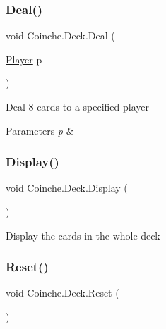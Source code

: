 \subsubsection{\texorpdfstring{Deal()}{Deal()}}
{\footnotesize\ttfamily void Coinche.\+Deck.\+Deal (\begin{DoxyParamCaption}\item[{\hyperlink{class_coinche_1_1_player}{Player}}]{p }\end{DoxyParamCaption})\hspace{0.3cm}{\ttfamily [inline]}}



Deal 8 cards to a specified player 


\begin{DoxyParams}{Parameters}
{\em p} & \\
\hline
\end{DoxyParams}
\mbox{\label{class_coinche_1_1_deck_a05027ece37a4f59773be023f76c64947}} 
\subsubsection{\texorpdfstring{Display()}{Display()}}
{\footnotesize\ttfamily void Coinche.\+Deck.\+Display (\begin{DoxyParamCaption}{ }\end{DoxyParamCaption})\hspace{0.3cm}{\ttfamily [inline]}}



Display the cards in the whole deck 

\mbox{\label{class_coinche_1_1_deck_a2c869fc45763e7c847d51db4016f30a9}} 
\subsubsection{\texorpdfstring{Reset()}{Reset()}}
{\footnotesize\ttfamily void Coinche.\+Deck.\+Reset (\begin{DoxyParamCaption}{ }\end{DoxyParamCaption})\hspace{0.3cm}{\ttfamily [inline]}}



